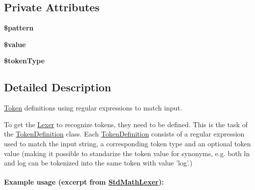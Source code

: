 \subsection*{Private Attributes}
\begin{DoxyCompactItemize}
\item 
\hypertarget{classMathParser_1_1Lexing_1_1TokenDefinition_acfea1a6b7d04da3e5fca0ef67fa804a8}{{\bfseries \$pattern}}\label{classMathParser_1_1Lexing_1_1TokenDefinition_acfea1a6b7d04da3e5fca0ef67fa804a8}

\item 
\hypertarget{classMathParser_1_1Lexing_1_1TokenDefinition_a6658afba1a8540a8a9f2c8df268ad386}{{\bfseries \$value}}\label{classMathParser_1_1Lexing_1_1TokenDefinition_a6658afba1a8540a8a9f2c8df268ad386}

\item 
\hypertarget{classMathParser_1_1Lexing_1_1TokenDefinition_ae5dacb8bc549085fd49a815fb2a07bc5}{{\bfseries \$token\-Type}}\label{classMathParser_1_1Lexing_1_1TokenDefinition_ae5dacb8bc549085fd49a815fb2a07bc5}

\end{DoxyCompactItemize}


\subsection{Detailed Description}
\hyperlink{classMathParser_1_1Lexing_1_1Token}{Token} definitions using regular expressions to match input. 

To get the \hyperlink{classMathParser_1_1Lexing_1_1Lexer}{Lexer} to recognize tokens, they need to be defined. This is the task of the \hyperlink{classMathParser_1_1Lexing_1_1TokenDefinition}{Token\-Definition} class. Each \hyperlink{classMathParser_1_1Lexing_1_1TokenDefinition}{Token\-Definition} consists of a regular expression used to match the input string, a corresponding token type and an optional token value (making it possible to standarize the token value for synonyms, e.\-g. both ln and log can be tokenized into the same token with value 'log'.)

\paragraph*{Example usage (excerpt from \hyperlink{classMathParser_1_1Lexing_1_1StdMathLexer}{Std\-Math\-Lexer})\-:}


